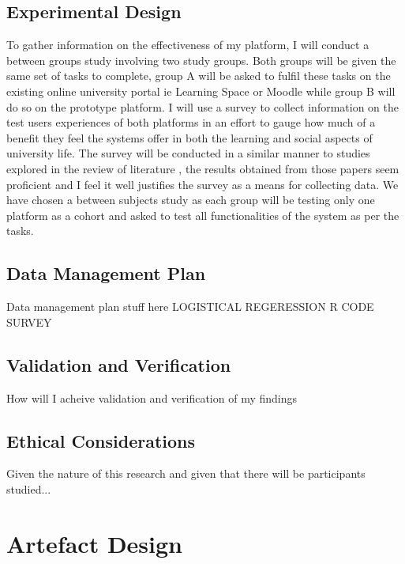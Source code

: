 \documentclass[lettersize,journal]{IEEEtran}
\begin{document}
    	\subsection{Experimental Design}
    	To gather information on the effectiveness of my platform, I will conduct a between groups study involving
    	two study groups. Both groups will be given the same set of tasks to complete, group A will be asked to fulfil 
    	these tasks on the existing online university portal ie Learning Space or Moodle while group B will
	do so on the prototype platform. I will use a survey to collect information on the test users experiences
    	of both platforms in an effort to gauge how much of a benefit they feel the systems offer in both the
    	learning and social aspects of university life. The survey will be conducted in a similar manner to
	studies explored in the review of literature \cite{Liu2010}\cite{Baruah2012}\cite{Wang2011}\cite{Evans2014}\cite{Akram et al 2017},
	the results obtained from those papers seem proficient and I feel it well justifies the survey as a means for collecting data.
	We have chosen a between subjects study	as each group will be testing only one platform as a cohort and asked to test all functionalities of
    	the system as per the tasks.

	\subsection{Data Management Plan}
	Data management plan stuff here
LOGISTICAL REGERESSION R CODE SURVEY
	\subsection{Validation and Verification}
	How will I acheive validation and verification of my findings

	\subsection{Ethical Considerations}
	Given the nature of this research and given that there will be participants studied...

\section{Artefact Design}
\end{document}
